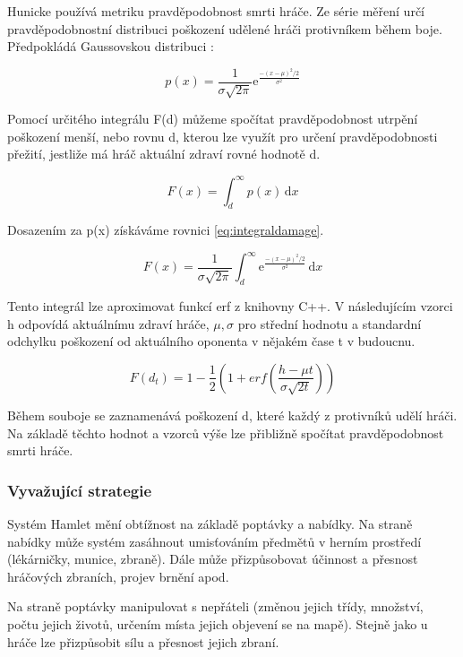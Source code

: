 Hunicke používá metriku pravděpodobnost smrti hráče. Ze série měření určí pravděpodobnostní distribuci poškození udělené hráči protivníkem během boje. Předpokládá Gaussovskou distribuci :

\begin{equation}
	   p(x)=\frac{1}{\sigma\sqrt{2\pi}}\mathrm{e}^{\frac{-(x-\mu)^2/2}{\sigma^2}}
\end{equation}

Pomocí určitého integrálu F(d) můžeme spočítat pravděpodobnost utrpění poškození menší, nebo rovnu d, kterou lze využít pro určení pravděpodobnosti přežití, jestliže má hráč aktuální zdraví rovné hodnotě d.

\begin{equation}
	   F(x) = \int_d^\infty p(x)\,\mathrm{d}x
\end{equation}

Dosazením za p(x) získáváme rovnici \ref{eq:integraldamage}.

\begin{equation} \label{eq:integraldamage}
	   F(x) = \frac{1}{\sigma\sqrt{2\pi}}\int_d^\infty \mathrm{e}^{\frac{-(x-\mu)^2/2}{\sigma^2}}\,\mathrm{d}x
\end{equation}

Tento integrál lze aproximovat funkcí erf z knihovny C++. V následujícím vzorci h odpovídá aktuálnímu zdraví hráče, $\mu, \sigma$ pro střední hodnotu a standardní odchylku poškození od aktuálního oponenta v nějakém čase t v budoucnu.

\begin{equation}
	   F(d_t) = 1-\frac{1}{2}(1+erf(\frac{h-\mu t}{\sigma\sqrt{2t}}))
\end{equation}

Během souboje se zaznamenává poškození d, které každý z protivníků udělí hráči. Na základě těchto hodnot a vzorců výše lze přibližně spočítat pravděpodobnost smrti hráče.

\subsubsection{Vyvažující strategie}

Systém Hamlet mění obtížnost na základě poptávky a nabídky. Na straně nabídky může systém zasáhnout umisťováním předmětů v herním prostředí (lékárničky, munice, zbraně). Dále může přizpůsobovat účinnost a přesnost hráčových zbraních, projev brnění apod.

Na straně poptávky manipulovat s nepřáteli (změnou jejich třídy, množství, počtu jejich životů, určením místa jejich objevení se na mapě). Stejně jako u hráče lze přizpůsobit sílu a přesnost jejich zbraní.

